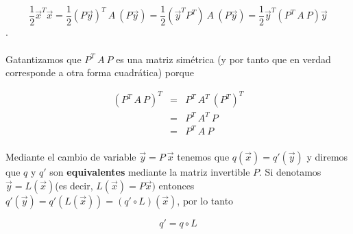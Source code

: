 \begin{equation*}
    \frac{1}{2}\overrightarrow{x}^{T}\overrightarrow{x} = \frac{1}{2}\left(P\overrightarrow{y}\right)^{T}~A~\left(P\overrightarrow{y}\right) = \frac{1}{2}\left(\overrightarrow{y}^{T} P^{T}\right)~A~\left(P\overrightarrow{y}\right) = \frac{1}{2}\overrightarrow{y}^{T}\left(P^{T}~A~P\right)\overrightarrow{y}
\end{equation*}.

\paragraph*{}
Gatantizamos que $P^{T}~A~P$ es una matriz simétrica (y por tanto que en verdad corresponde a otra forma cuadrática) porque

\begin{eqnarray*}
\left(P^{T}~A~P\right)^{T}&=&P^{T}~A^{T}~\left(P^{T}\right)^{T}\\
&=&P^{T}~A^{T}~P\\
&=&P^{T}~A~P
\end{eqnarray*}

\paragraph*{}
Mediante el cambio de variable $\overrightarrow{y} = P~\overrightarrow{x}$ tenemos que $q(\overrightarrow{x}) = q'(\overrightarrow{y})$ y diremos que $q$ y $q'$ son \textbf{equivalentes} mediante la matriz invertible $P$. Si denotamos $\overrightarrow{y} = L(\overrightarrow{x})$(es decir, $L(\overrightarrow{x}) = P\overrightarrow{x})$ entonces $q'(\overrightarrow{y}) = q'\left(L(\overrightarrow{x})\right) = \left(q' \circ L\right)(\overrightarrow{x})$, por lo tanto

\begin{equation*}
q' = q \circ L
\end{equation*}

